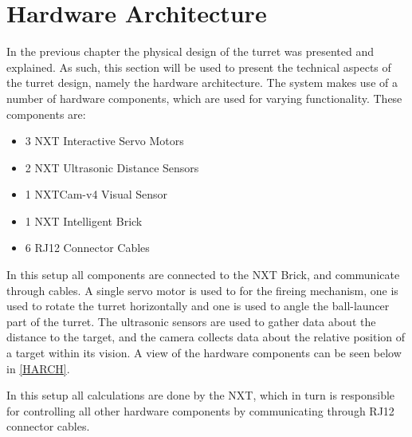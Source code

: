 \section{Hardware Architecture}
In the previous chapter the physical design of the turret was presented and
explained. As such, this section will be used to present the technical aspects
of the turret design, namely the hardware architecture. The \name system makes
use of a number of hardware components, which are used for varying
functionality. These components are:

\begin{itemize}
  \item 3 NXT Interactive Servo Motors
  \item 2 NXT Ultrasonic Distance Sensors
  \item 1 NXTCam-v4 Visual Sensor
  \item 1 NXT Intelligent Brick
  \item 6 RJ12 Connector Cables
\end{itemize}

In this setup all components are connected to the NXT Brick, and communicate
through cables. A single servo motor is used to for the fireing mechanism, one
is used to rotate the turret horizontally and one is used to angle the
ball-launcer part of the turret. The ultrasonic sensors are used to gather data
about the distance to the target, and the camera collects data about the
relative position of a target within its vision. A view of the hardware
components can be seen below in \autoref{HARCH}.


In this setup all calculations are done by the NXT, which in turn is responsible
for controlling all other hardware components by communicating through RJ12
connector cables.